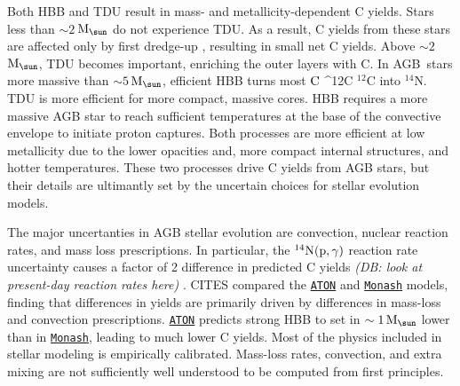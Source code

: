 \documentclass[fleqn,
usenatbib]{mnras}
\makeatletter
\newcommand{\monash}{\texttt{\hyperlink{monash}{Monash}}}
\newcommand{\aton}{\texttt{\hyperlink{aton}{ATON}}}
\newcommand{\agb}{AGB}
\newcommand{\C}[1][\@nil]{
    \def\tmp{#1}%
    \ifx\tmp\@nnil%
        \ensuremath{\rm C}%
    \else%
        \ifmmode ^{#1}{\rm C}%
        \else $^{#1}$C%
        \fi%
\fi }
\newcommand{\Mo}{ {\rm M}_{\sun}}
\newcommand{\about}[1]{${\sim} #1$}
\newcommand{\dbnote}[1]{ {\color{Thistle} \textit{\small (DB: #1)}} }
\makeatother
\begin{document}


Both HBB and TDU result in mass- and metallicity-dependent C yields. 
Stars less than \about{2}\,$\Mo$ do not experience TDU. As a result, C yields from these stars are affected only by first dredge-up \citep[Table 1]{karakas10}, resulting in small net C yields.
Above \about{2}\,$\Mo$, TDU becomes important, enriching the outer layers with C.
In \agb\ stars more massive than \about{5}\,$\Mo$, efficient HBB turns most \C[12] into $^{14}$N.
TDU is more efficient for more compact, massive cores. HBB requires a more massive AGB star to reach sufficient temperatures at the base of the convective envelope to initiate proton captures. Both processes are more efficient at low metallicity due to the lower opacities and, more compact internal structures, and hotter temperatures. These two processes drive C yields from AGB stars, but their details are ultimantly set by the uncertain choices for stellar evolution models.



The major uncertanties in AGB stellar evolution are convection, nuclear reaction rates, and mass loss prescriptions.
In particular, the $^{14}{\rm N}({\rm p},\gamma)$ reaction rate uncertainty causes a factor of 2 difference in predicted C yields \citep{herwig+austin2004, HAL2006} \dbnote{look at present-day reaction rates here}.
CITES compared the \aton{} and \monash{} models, finding that differences in yields are primarily driven by differences in mass-loss and convection prescriptions. \aton{} predicts strong HBB to set in $\sim{1}\,\Mo$ lower than in \monash{}, leading to much lower C yields.
Most of the physics included in stellar modeling is empirically calibrated. Mass-loss rates, convection, and extra mixing are not sufficiently well understood to be computed from first principles.
\end{document}

